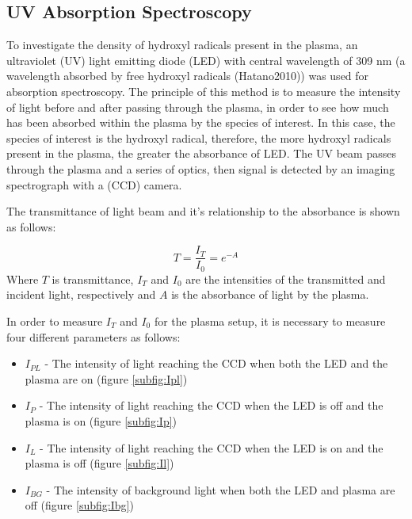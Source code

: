 \documentclass[11pt, oneside]{article}   	%
\begin{document}
\subsection{UV Absorption Spectroscopy}
To investigate the density of hydroxyl radicals present in the plasma, an ultraviolet (UV) light emitting diode (LED) with central wavelength of 309 nm (a wavelength absorbed by free hydroxyl radicals (Hatano2010)) was used for absorption spectroscopy.
The principle of this method is to measure the intensity of light before and after passing through the plasma, in order to see how much has been absorbed within the plasma by the species of interest.
In this case, the species of interest is the hydroxyl radical, therefore, the more hydroxyl radicals present in the plasma, the greater the absorbance of LED.
The UV beam passes through the plasma and a series of optics, then signal is detected by an imaging spectrograph with a (CCD) camera.

The transmittance of light beam and it's relationship to the absorbance is shown as follows:


\begin{equation} \label{eqn:Transmittance}
    T = \frac{I_T}{I_0} = e^{-A}
\end{equation}
Where $T$ is transmittance, $I_T$ and $I_0$ are the intensities of the transmitted and incident light, respectively and $A$ is the absorbance of light by the plasma.

In order to measure $I_T$ and $I_0$ for the plasma setup, it is necessary to measure four different parameters as follows:
\begin{itemize}
    \item $I_{PL}$ - The intensity of light reaching the CCD when both the LED and the plasma are on (figure \ref{subfig:Ipl})
    \item $I_{P}$ - The intensity of light reaching the CCD when the LED is off and the plasma is on (figure \ref{subfig:Ip})
    \item $I_L$ - The intensity of light reaching the CCD when the LED is on and the plasma is off (figure \ref{subfig:Il})
    \item $I_{BG}$ - The intensity of background light when both the LED and plasma are off (figure \ref{subfig:Ibg})
\end{itemize}
\end{document}
